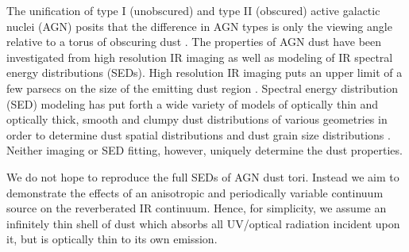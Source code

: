 The unification of type I (unobscured) and type II (obscured) active galactic
nuclei (AGN) posits that the difference in AGN types is only the viewing angle
relative to a torus of obscuring dust \citep{Antonucci:1993,
KrolikBegelman:1988}. The properties of AGN dust have been investigated from
high resolution IR imaging as well as modeling of IR spectral energy
distributions (SEDs). High resolution IR imaging puts an upper limit of a few
parsecs on the size of the emitting dust region \citep[see][and references within]{Elitzur:2006}. 
Spectral energy distribution (SED) modeling has put
forth a wide variety of models of optically thin and optically thick, smooth
and clumpy dust distributions of various geometries in order to determine dust
spatial distributions and dust grain size distributions  \citep[see the review by][as well as  \cite{Barvainis:1987,PierKrolikI:1992b, PierKrolikII:1993, LaorDraine:1993, GranatoDanese:1994,  Granato:1997,RowanRobinson:1995,Manske:1998,Nenkova:2002,vanBemmelDullemond:2003, Schartmann:2005, NenkovaI:2008,NenkovaII:2008, HonigII:2010, MorTrakhtenbrot:2011,MorNetzer:2012}]{Netzer:2015:rev}. Neither imaging or SED fitting, however, uniquely determine the dust properties.



We do not hope to reproduce the full SEDs of AGN dust tori. Instead we aim to
demonstrate the effects of an anisotropic and periodically variable continuum
source on the reverberated IR continuum. Hence, for simplicity, we assume an
infinitely thin shell of dust which absorbs all UV/optical radiation incident
upon it, but is optically thin to its own emission.










